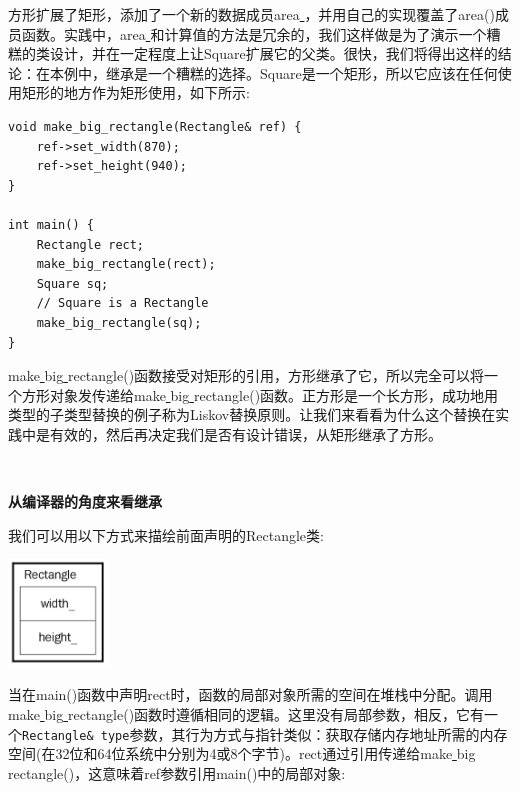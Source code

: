 方形扩展了矩形，添加了一个新的数据成员area\underline{ }，并用自己的实现覆盖了area()成员函数。实践中，area\underline{ }和计算值的方法是冗余的，我们这样做是为了演示一个糟糕的类设计，并在一定程度上让Square扩展它的父类。很快，我们将得出这样的结论：在本例中，继承是一个糟糕的选择。Square是一个矩形，所以它应该在任何使用矩形的地方作为矩形使用，如下所示:\par

\begin{lstlisting}[caption={}]
void make_big_rectangle(Rectangle& ref) {
	ref->set_width(870);
	ref->set_height(940);
}

int main() {
	Rectangle rect;
	make_big_rectangle(rect);
	Square sq;
	// Square is a Rectangle
	make_big_rectangle(sq);
}
\end{lstlisting}

make\underline{ }big\underline{ }rectangle()函数接受对矩形的引用，方形继承了它，所以完全可以将一个方形对象发传递给make\underline{ }big\underline{ }rectangle()函数。正方形是一个长方形，成功地用类型的子类型替换的例子称为Liskov替换原则。让我们来看看为什么这个替换在实践中是有效的，然后再决定我们是否有设计错误，从矩形继承了方形。 \par

\noindent\textbf{}\ \par
\textbf{从编译器的角度来看继承} \ \par
我们可以用以下方式来描绘前面声明的Rectangle类: \par

\begin{center}
	\includegraphics[width=0.2\textwidth]{content/Section-1/Chapter-3/13}
\end{center}

当在main()函数中声明rect时，函数的局部对象所需的空间在堆栈中分配。调用make\underline{ }big\underline{ }rectangle()函数时遵循相同的逻辑。这里没有局部参数，相反，它有一个\texttt{Rectangle\& type}参数，其行为方式与指针类似：获取存储内存地址所需的内存空间(在32位和64位系统中分别为4或8个字节)。rect通过引用传递给make\underline{ }big\underline{ }rectangle()，这意味着ref参数引用main()中的局部对象: \par

